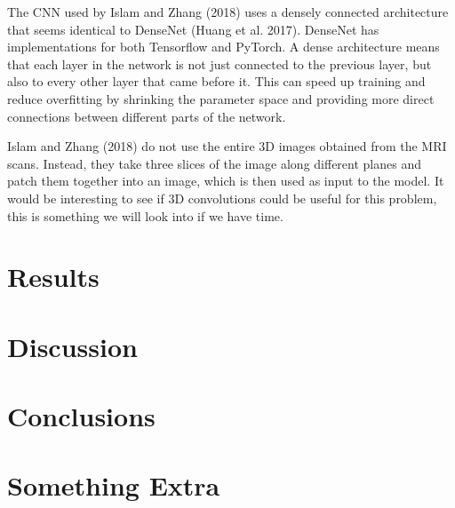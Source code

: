 \documentclass{kththesis}
\begin{document}
The CNN used by Islam and Zhang (2018) uses a densely connected architecture that seems identical to DenseNet (Huang et al. 2017). DenseNet has implementations for both Tensorflow and PyTorch. A dense architecture means that each layer in the network is not just connected to the previous layer, but also to every other layer that came before it. This can speed up training and reduce overfitting by shrinking the parameter space and providing more direct connections between different parts of the network.

Islam and Zhang (2018) do not use the entire 3D images obtained from the MRI scans. Instead, they take three slices of the image along different planes and patch them together into an image, which is then used as input to the model. It would be interesting to see if 3D convolutions could be useful for this problem, this is something we will look into if we have time.


\chapter{Results}

\chapter{Discussion}

\chapter{Conclusions}

\printbibliography[heading=bibintoc]

\appendix

\chapter{Something Extra}

\tailmatter
\end{document}
